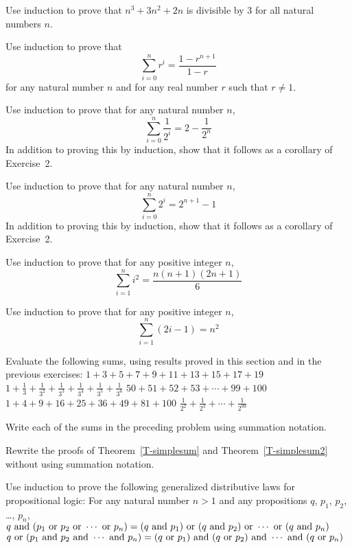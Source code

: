 \begin{exercises}

\problem Use induction to prove that $n^3 + 3n^2 + 2n$ is divisible by 3
for all natural numbers $n$.

\problem Use induction to prove that
\[\sum_{i=0}^{n}r^i=\frac{1-r^{n+1}}{1-r}\]
for any natural number $n$ and for any real number $r$ such that $r\not=1$.

\problem Use induction to prove that for any natural number $n$,
\[\sum_{i=0}^{n}\frac{1}{2^i}=2-\frac{1}{2^{n}}\]
In addition to proving this by induction, show that it follows
as a corollary of Exercise~2.

\problem Use induction to prove that for any natural number $n$,
\[\sum_{i=0}^{n}2^i=2^{n+1}-1\]
In addition to proving this by induction, show that it follows
as a corollary of Exercise~2.

\problem Use induction to prove that for any positive integer $n$,
\[\sum_{i=1}^ni^2=\frac{n(n+1)(2n+1)}{6}\]

\problem Use induction to prove that for any positive integer $n$,
\[\sum_{i=1}^n(2i-1)=n^2\]

\problem Evaluate the following sums, using results proved in this
section and in the previous exercises:
\ppart $1+3+5+7+9+11+13+15+17+19$
\ppart $\displaystyle 1+\frac{1}{3}+\frac{1}{3^2}+\frac{1}{3^3}+\frac{1}{3^4}+\frac{1}{3^5}+\frac{1}{3^6}$
\ppart $50+51+52+53+\cdots+99+100$
\ppart $1+4+9+16+25+36+49+81+100$
\ppart $\displaystyle \frac{1}{2^2}+\frac{1}{2^3}+\cdots+\frac{1}{2^{99}}$

\problem Write each of the sums in the preceding problem using
summation notation.

\problem Rewrite the proofs of Theorem~\ref{T-simplesum} and
Theorem~\ref{T-simplesum2} without using summation notation.

\problem Use induction to prove the following generalized distributive
laws for propositional logic:  For any natural number $n>1$ and any
propositions $q$, $p_1$, $p_2$, \dots, $p_n$,
\ppart $q\text{ and }(p_1\text{ or } p_2\text{ or }\cdots\text{ or } p_n)=(q\text{ and } p_1)\text{ or }(q\text{ and } p_2)\text{ or }\cdots\text{ or }(q\text{ and } p_n)$
\ppart $q\text{ or }(p_1\text{ and } p_2\text{ and }\cdots\text{ and } p_n)=(q\text{ or } p_1)\text{ and }(q\text{ or } p_2)\text{ and }\cdots\text{ and }(q\text{ or } p_n)$


\end{exercises}



